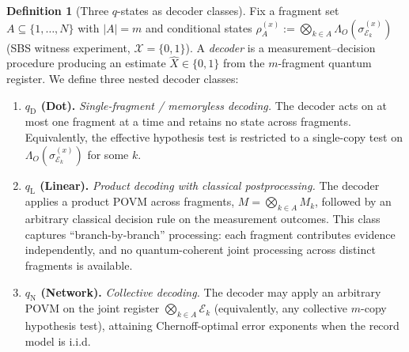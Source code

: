 \documentclass[11pt]{article}
\newcommand{\cE}{\mathcal{E}}
\newcommand{\cX}{\mathcal{X}}
\newcommand{\1}{\mathbf{1}}
\theoremstyle{definition}
\newtheorem{definition}{Definition}
\theoremstyle{plain}
\begin{document}
\begin{definition}[Three $q$-states as decoder classes]
\label{def:q-states}
Fix a fragment set $A\subseteq\{1,\dots,N\}$ with $|A|=m$ and conditional states
$\rho_A^{(x)}:=\bigotimes_{k\in A}\Lambda_O(\sigma^{(x)}_{\cE_k})$ (SBS witness experiment, $\cX=\{0,1\}$).
A \emph{decoder} is a measurement--decision procedure producing an estimate $\widehat{X}\in\{0,1\}$ from the $m$-fragment quantum register.
We define three nested decoder classes:
\begin{enumerate}[leftmargin=2.2em,label=(\roman*)]
\item \textbf{$q_{\mathrm{D}}$ (Dot).} \emph{Single-fragment / memoryless decoding.}
The decoder acts on at most one fragment at a time and retains no state across fragments.
Equivalently, the effective hypothesis test is restricted to a single-copy test on $\Lambda_O(\sigma^{(x)}_{\cE_k})$ for some $k$.

\item \textbf{$q_{\mathrm{L}}$ (Linear).} \emph{Product decoding with classical postprocessing.}
The decoder applies a product POVM across fragments,
$M = \bigotimes_{k\in A} M_k$,
followed by an arbitrary classical decision rule on the measurement outcomes.
This class captures ``branch-by-branch'' processing: each fragment contributes evidence independently, and no quantum-coherent joint processing across distinct fragments is available.

\item \textbf{$q_{\mathrm{N}}$ (Network).} \emph{Collective decoding.}
The decoder may apply an arbitrary POVM on the joint register $\bigotimes_{k\in A}\cE_k$ (equivalently, any collective $m$-copy hypothesis test), attaining Chernoff-optimal error exponents when the record model is i.i.d.
\end{enumerate}
\end{definition}
\end{document}
